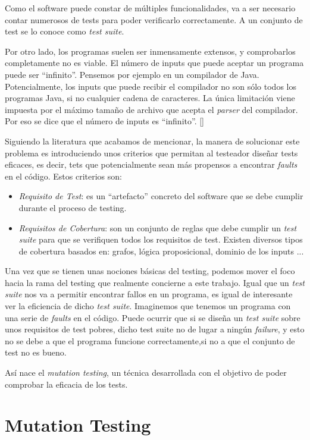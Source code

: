 Como el software puede constar de múltiples funcionalidades, va a ser necesario contar numerosos de tests para poder verificarlo correctamente. A un conjunto de test se lo conoce como \textit{test suite}. 

Por otro lado, los programas suelen ser inmensamente extensos, y comprobarlos completamente no es viable. El número de inputs  que puede aceptar un programa puede ser ``infinito''. Pensemos por ejemplo en un compilador de Java. Potencialmente, los inputs que puede recibir el compilador no son sólo todos los programas Java, si no cualquier cadena de caracteres. La única limitación viene impuesta por el máximo tamaño de archivo que acepta el \textit{parser} del compilador. Por eso se dice que el número de inputs es ``infinito''. [\cite{ammann2016introduction}]

Siguiendo la literatura que acabamos de mencionar, la manera de solucionar este problema es introduciendo unos criterios que permitan al testeador diseñar tests eficaces, es decir, tets que potencialmente sean más propensos a encontrar \textit{faults} en el código. Estos criterios son:
\begin{itemize}
\item \emph{Requisito de Test}: es un ``artefacto'' concreto del software que se debe cumplir durante el proceso de testing.
\item \emph{Requisitos de Cobertura}: son un conjunto de reglas que debe cumplir un \textit{test suite} para que se verifiquen todos los requisitos de test. Existen diversos tipos de cobertura basados en: grafos, lógica proposicional, dominio de los inputs ...
\end{itemize}

Una vez que se tienen unas nociones básicas del testing, podemos mover el foco hacia la rama del testing que realmente concierne a este trabajo. Igual que un \textit{test suite} nos va a permitir
encontrar fallos en un programa, es igual de interesante ver la eficiencia de dicho \textit{test suite}. Imaginemos que tenemos un programa con una serie de \emph{faults} en el código. Puede ocurrir que si se diseña un \textit{test suite} sobre unos requisitos de test pobres, dicho test suite no de lugar a ningún \emph{failure}, y esto no se debe a que el programa funcione correctamente,si no a que el conjunto de test no es bueno.

Así nace el \textit{mutation testing}, un técnica desarrollada con el objetivo de poder comprobar la eficacia de los tests.

\section{Mutation Testing}